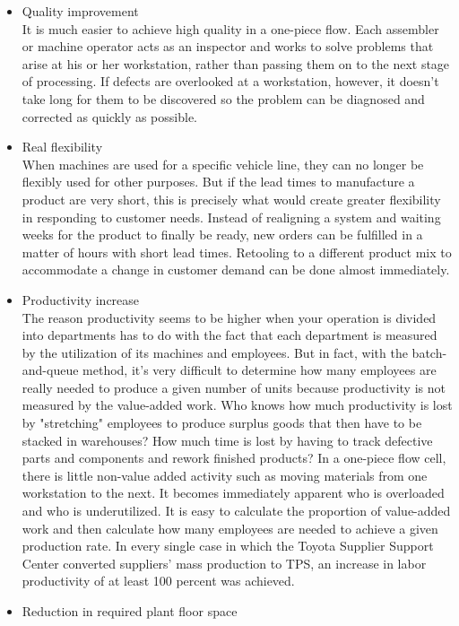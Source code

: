 \documentclass[a4paper,12pt]{scrartcl}
\begin{document}
\begin{itemize}
    \item Quality improvement\\
    It is much easier to achieve high quality in a one-piece flow. Each assembler or machine operator acts as an inspector and works to solve problems that arise at his or her workstation, rather than passing them on to the next stage of processing. If defects are overlooked at a workstation, however, it doesn't take long for them to be discovered so the problem can be diagnosed and corrected as quickly as possible.
    \item Real flexibility\\
    When machines are used for a specific vehicle line, they can no longer be flexibly used for other purposes. But if the lead times to manufacture a product are very short, this is precisely what would create greater flexibility in responding to customer needs. Instead of realigning a system and waiting weeks for the product to finally be ready, new orders can be fulfilled in a matter of hours with short lead times. Retooling to a different product mix to accommodate a change in customer demand can be done almost immediately.
    \item Productivity increase\\
    The reason productivity seems to be higher when your operation is divided into departments has to do with the fact that each department is measured by the utilization of its machines and employees. But in fact, with the batch-and-queue method, it's very difficult to determine how many employees are really needed to produce a given number of units because productivity is not measured by the value-added work. Who knows how much productivity is lost by "stretching" employees to produce surplus goods that then have to be stacked in warehouses? How much time is lost by having to track defective parts and components and rework finished products? In a one-piece flow cell, there is little non-value added activity such as moving materials from one workstation to the next. It becomes immediately apparent who is overloaded and who is underutilized. It is easy to calculate the proportion of value-added work and then calculate how many employees are needed to achieve a given production rate. In every single case in which the Toyota Supplier Support Center converted suppliers' mass production to TPS, an increase in labor productivity of at least 100 percent was achieved.
    \item Reduction in required plant floor space\\

\end{itemize}
\end{document}
